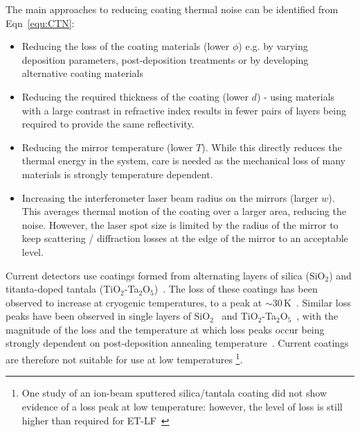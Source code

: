The main approaches to reducing coating thermal noise can be identified from Eqn~\ref{equ:CTN}:
\begin{itemize}
	\item Reducing the loss of the coating materials (lower $\phi$) e.g. by varying deposition parameters, post-deposition treatments or by developing alternative coating materials
	\item Reducing the required thickness of the coating (lower $d$) - using materials with a large contrast in refractive index results in fewer pairs of layers being required to provide the same reflectivity.
	\item Reducing the mirror temperature (lower $T$). While this directly reduces the thermal energy in the system, care is needed as the mechanical loss of many materials is strongly temperature dependent.
    \item Increasing the interferometer laser beam radius on the mirrors (larger $w$). This averages thermal motion of the coating over a larger area, reducing the noise. However, the laser spot size is limited by the radius of the mirror to keep scattering / diffraction losses at the edge of the mirror to an acceptable level.
\end{itemize}
Current detectors use coatings formed from alternating layers of silica (SiO$_2$) and titanta-doped tantala (TiO$_2$-Ta$_2$O$_5$)~\cite{Pinard2017,Flaminio2010,Harry2007}. The loss of these coatings has been observed to increase at cryogenic temperatures, to a peak at $\sim$30\,K~\cite{Granata2013}. Similar loss peaks have been observed in single layers of SiO$_2$~\cite{Martin2014} and TiO$_2$-Ta$_2$O$_5$~\cite{Martin2009}, with the magnitude of the loss and the temperature at which loss peaks occur being strongly dependent on post-deposition annealing temperature~\cite{RobieThesis,Martin2010}. Current coatings are therefore not suitable for use at low temperatures \footnote{One study of an ion-beam sputtered silica/tantala coating did not show evidence of a loss peak at low temperature: however, the level of loss is still higher than required for ET-LF~\cite{Hirose2014}}.

